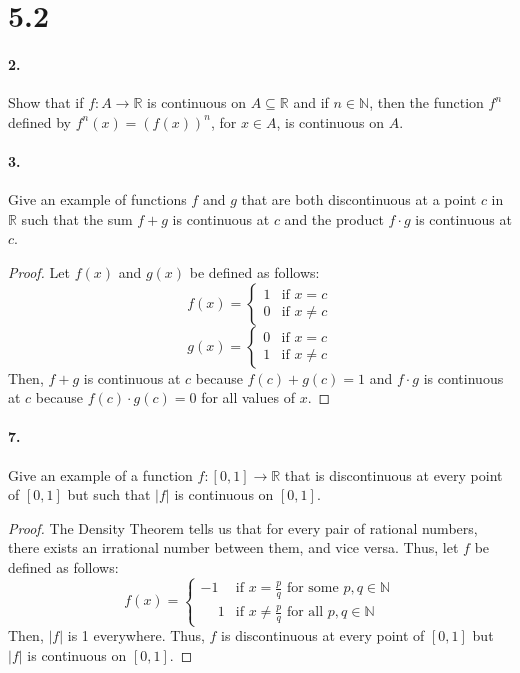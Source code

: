 \documentclass[12pt]{article}
\theoremstyle{remark}
\begin{document}
\section*{5.2}
\paragraph{2.} Show that if $f: A \rightarrow \mathbb{R}$ is continuous on $A \subseteq \mathbb{R}$ and if $n \in \mathbb{N}$, then the function $f^n$ defined by $f^n(x)=(f(x))^n$, for $x \in A$, is continuous on $A$.

\paragraph{3.} Give an example of functions $f$ and $g$ that are both discontinuous at a point $c$ in $\mathbb{R}$ such that the sum $f + g$ is continuous at $c$ and the product $f \cdot g$ is continuous at $c$.
\begin{proof}
    Let $f(x)$ and $g(x)$ be defined as follows:
    $$f(x) = \begin{cases}
        1 & \text{if } x = c \\
        0 & \text{if } x \neq c
    \end{cases}$$
    $$g(x) = \begin{cases}
        0 & \text{if } x = c \\
        1 & \text{if } x \neq c
    \end{cases}$$
    Then, $f + g$ is continuous at $c$ because $f(c) + g(c) = 1$ and $f \cdot g$ is continuous at $c$ because $f(c) \cdot g(c) = 0$ for all values of $x$.
\end{proof}

\paragraph{7.} Give an example of a function $f:[0,1] \rightarrow \mathbb{R}$ that is discontinuous at every point of $[0,1]$ but such that $|f|$ is continuous on $[0,1]$.
\begin{proof}
    The Density Theorem tells us that for every pair of rational numbers, there exists an irrational number between them, and vice versa. Thus, let $f$ be defined as follows:
    $$f(x) = \begin{cases}
        -1 & \text{if } x = \frac{p}{q} \text{ for some } p, q \in \mathbb{N} \\
        \phantom{-}1 & \text{if } x \neq \frac{p}{q} \text{ for all } p, q \in \mathbb{N}
    \end{cases}$$
    Then, $|f|$ is 1 everywhere. Thus, $f$ is discontinuous at every point of $[0,1]$ but $|f|$ is continuous on $[0,1]$.
\end{proof}
\end{document}
